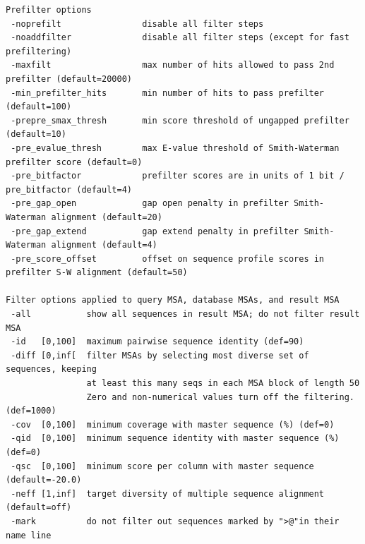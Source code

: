 \documentclass[11pt,a4paper]{article}
\begin{document}
\begin{verbatim}
Prefilter options                                                               
 -noprefilt                disable all filter steps                                        
 -noaddfilter              disable all filter steps (except for fast prefiltering)         
 -maxfilt                  max number of hits allowed to pass 2nd prefilter (default=20000)   
 -min_prefilter_hits       min number of hits to pass prefilter (default=100)               
 -prepre_smax_thresh       min score threshold of ungapped prefilter (default=10)               
 -pre_evalue_thresh        max E-value threshold of Smith-Waterman prefilter score (default=0)
 -pre_bitfactor            prefilter scores are in units of 1 bit / pre_bitfactor (default=4)
 -pre_gap_open             gap open penalty in prefilter Smith-Waterman alignment (default=20)
 -pre_gap_extend           gap extend penalty in prefilter Smith-Waterman alignment (default=4)
 -pre_score_offset         offset on sequence profile scores in prefilter S-W alignment (default=50)

Filter options applied to query MSA, database MSAs, and result MSA              
 -all           show all sequences in result MSA; do not filter result MSA      
 -id   [0,100]  maximum pairwise sequence identity (def=90)
 -diff [0,inf[  filter MSAs by selecting most diverse set of sequences, keeping 
                at least this many seqs in each MSA block of length 50 
                Zero and non-numerical values turn off the filtering. (def=1000) 
 -cov  [0,100]  minimum coverage with master sequence (%) (def=0)             
 -qid  [0,100]  minimum sequence identity with master sequence (%) (def=0)    
 -qsc  [0,100]  minimum score per column with master sequence (default=-20.0)    
 -neff [1,inf]  target diversity of multiple sequence alignment (default=off)   
 -mark          do not filter out sequences marked by ">@"in their name line  


\end{verbatim}
\end{document}
